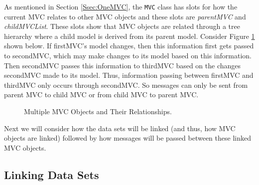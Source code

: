\documentclass{article}[11pt]
\newcommand{\Robject}[1]{{\texttt{#1}}}
\newcommand{\Rslot}[1]{\textsl{#1}}
\begin{document}
As mentioned in Section \ref{Ssec:OneMVC}, the \Robject{MVC} class has slots
for how the current MVC relates to other MVC objects and these slots are
\Rslot{parentMVC} and \Rslot{childMVCList}.  These slots show that MVC objects
are related through a tree hierarchy where a child model is derived from its
parent model.  Consider Figure \ref{Fig:SmallHier} shown below.  If firstMVC's
model changes, then this information first gets passed to secondMVC, which may
make changes to its model based on this information.  Then secondMVC passes
this information to thirdMVC based on the changes secondMVC made to its model.
Thus, information passing between firstMVC and thirdMVC only occurs through
secondMVC.  So messages can only be sent from parent MVC to child MVC or from
child MVC to parent MVC.

\begin{figure}[ht]
  \begin{center}
    \caption{ Multiple MVC Objects and Their Relationships. }
    \label{Fig:SmallHier}
  \end{center}
\end{figure}

Next we will consider how the data sets will be linked (and thus, how MVC
objects are linked) followed by how messages will be passed between these
linked MVC objects. 

\subsection{Linking Data Sets}\label{Ssec:MultLink}
\end{document}
